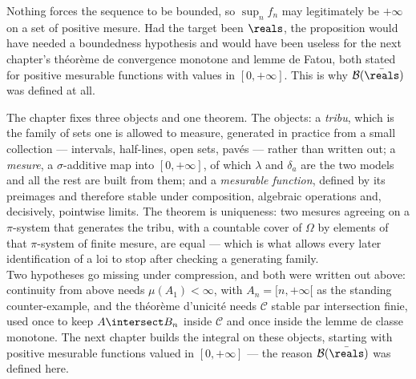 \begin{remark}
  Nothing forces the sequence to be bounded, so $\sup_{n} f_{n}$ may legitimately be
  $+\infty$ on a set of positive mesure. Had the target been $\reals$, the
  proposition would have needed a boundedness hypothesis and would have been useless
  for the next chapter's théorème de convergence monotone and lemme de Fatou, both
  stated for positive mesurable functions with values in $[0,+\infty]$. This is why
  $\mathcal{B}(\bar{\reals})$ was defined at all.
\end{remark}

\begin{conclusion}
  The chapter fixes three objects and one theorem. The objects: a \emph{tribu}, which
  is the family of sets one is allowed to measure, generated in practice from a small
  collection --- intervals, half-lines, open sets, pavés --- rather than written out;
  a \emph{mesure}, a $\sigma$-additive map into $[0,+\infty]$, of which $\lambda$ and
  $\delta_{a}$ are the two models and all the rest are built from them; and a
  \emph{mesurable function}, defined by its preimages and therefore stable under
  composition, algebraic operations and, decisively, pointwise limits. The theorem is
  uniqueness: two mesures agreeing on a $\pi$-system that generates the tribu, with
  a countable cover of $\Omega$ by elements of that $\pi$-system of finite mesure,
  are equal --- which is what allows every later
  identification of a loi to stop after checking a generating family.\\

  Two hypotheses go missing under compression, and both were written out above:
  continuity from above needs $\mu(A_{1}) < \infty$, with $A_{n} = [n,+\infty[$ as
  the standing counter-example, and the théorème d'unicité needs $\mathcal{C}$ stable
  par intersection finie, used once to keep $A \intersect B_{n}$ inside
  $\mathcal{C}$ and once inside the lemme de classe monotone. The next chapter builds
  the integral on these objects, starting with positive mesurable functions valued in
  $[0,+\infty]$ --- the reason $\mathcal{B}(\bar{\reals})$ was defined here.
\end{conclusion}
